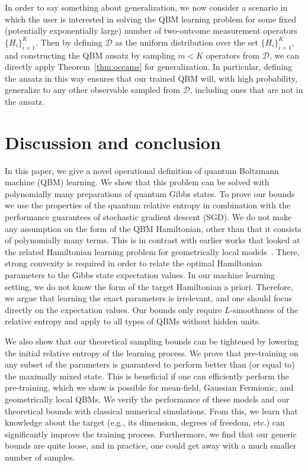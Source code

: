 \documentclass[
    aps,
    prx,
    onecolumn
]{revtex4-2}
\begin{document}
In order to say something about generalization, we now consider a scenario in which the user is interested in solving the QBM learning problem for some fixed (potentially exponentially large) number of two-outcome measurement operators $\{H_i\}_{i=1}^{K}$. Then by defining $\mathcal{D}$ as the uniform distribution over the set $\{H_i\}_{i=1}^{K}$, and constructing the QBM ansatz by sampling $m < K$ operators from $\mathcal{D}$, we can directly apply Theorem~\ref{thm:occams} for generalization. In particular, defining the ansatz in this way ensures that our trained QBM will, with high probability, generalize to any other observable sampled from $\mathcal{D}$, including ones that are not in the ansatz.

\section*{Discussion and conclusion}

In this paper, we give a novel operational definition of quantum Boltzmann machine (QBM) learning. We show that this problem can be solved with polynomially many preparations of quantum Gibbs states. To prove our bounds we use the properties of the quantum relative entropy in combination with the performance guarantees of stochastic gradient descent (SGD). We do not make any assumption on the form of the QBM Hamiltonian, other than that it consists of polynomially many terms. This is in contrast with earlier works that looked at the related Hamiltonian learning problem for geometrically local models~\cite{Anshu_2021, Haah_2022}. There, strong convexity is required in order to relate the optimal Hamiltonian parameters to the Gibbs state expectation values. In our machine learning setting, we do not know the form of the target Hamiltonian a priori. Therefore, we argue that learning the exact parameters is irrelevant, and one should focus directly on the expectation values. Our bounds only require $L$-smoothness of the relative entropy and apply to all types of QBMs without hidden units.

We also show that our theoretical sampling bounds can be tightened by lowering the initial relative entropy of the learning process. We prove that pre-training on any subset of the parameters is guaranteed to perform better than (or equal to) the maximally mixed state. This is beneficial if one can efficiently perform the pre-training, which we show is possible for mean-field, Gaussian Fermionic, and geometrically local QBMs. We verify the performance of these models and our theoretical bounds with classical numerical simulations. From this, we learn that knowledge about the target (e.g., its dimension, degrees of freedom, etc.) can significantly improve the training process. Furthermore, we find that our generic bounds are quite loose, and in practice, one could get away with a much smaller number of samples.  
\end{document}
